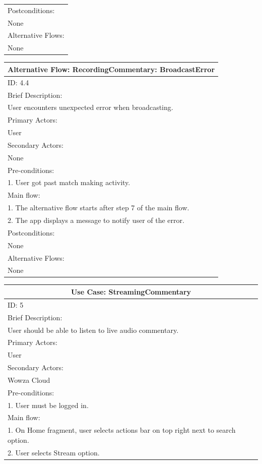 \documentclass{article}
\begin{document}
\begin{flushleft}
\begin{longtable}[l]{|l|}
\hline
Postconditions:\\
None\\
\hline
Alternative Flows:\\
None\\
\hline
\end{longtable}
\begin{longtable}[l]{|l|}
\hline
Alternative Flow: RecordingCommentary: BroadcastError\\
\hline
ID: 4.4\\
\hline
Brief Description: \\
User encounters unexpected error when broadcasting.\\
\hline
Primary Actors:\\
User\\
\hline
Secondary Actors:\\
None\\
\hline
Pre-conditions:\\
1. User got past match making activity.\\
\hline
Main flow:\\
1. The alternative flow starts after step 7 of the main flow.\\
2. The app displays a message to notify user of the error.\\
\hline
Postconditions:\\
None\\
\hline
Alternative Flows:\\
None\\
\hline
\end{longtable}
\begin{longtable}[l]{|l|}
\hline
\multicolumn{1}{|c|}{Use Case: StreamingCommentary}\\
\hline
ID: 5\\
\hline
Brief Description: \\
User should be able to listen to live audio commentary.\\
\hline
Primary Actors:\\
User\\
\hline
Secondary Actors:\\
Wowza Cloud\\
\hline
Pre-conditions:\\
1. User must be logged in.\\
\hline
Main flow:\\
1. On Home fragment, user selects actions bar on top right next to search option.\\
2. User selects Stream option.\\

\end{longtable}
\end{flushleft}
\end{document}
